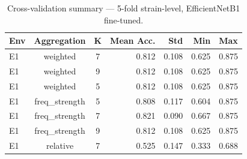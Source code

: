 \begin{table}[h]
\centering
\caption{Cross-validation summary --- 5-fold strain-level, EfficientNetB1 fine-tuned.}
\label{tab:cv_summary}
\begin{tabular}{@{}lccrrr@{}}
\toprule
\textbf{Env} & \textbf{Aggregation} & \textbf{K} & \textbf{Mean Acc.} & \textbf{Std} & \textbf{Min} & \textbf{Max} \\
\midrule
E1 & weighted & 7 & 0.812 & 0.108 & 0.625 & 0.875 \\
E1 & weighted & 9 & 0.812 & 0.108 & 0.625 & 0.875 \\
E1 & weighted & 5 & 0.812 & 0.108 & 0.625 & 0.875 \\
E1 & freq\_strength & 5 & 0.808 & 0.117 & 0.604 & 0.875 \\
E1 & freq\_strength & 7 & 0.821 & 0.090 & 0.667 & 0.875 \\
E1 & freq\_strength & 9 & 0.812 & 0.108 & 0.625 & 0.875 \\
E1 & relative & 7 & 0.525 & 0.147 & 0.333 & 0.688 \\
\bottomrule
\end{tabular}
\end{table}
